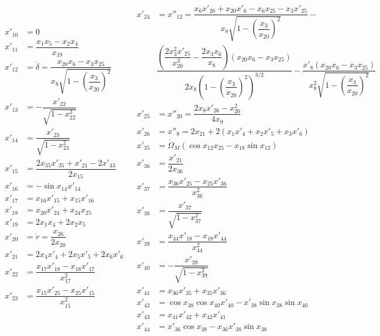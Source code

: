  \begin{align} \label{eq:derTransAnglAux}
\begin{split}
x'_{10} &= 0 \\
x'_{11} &=  \dfrac{x_{1}x_{5}-x_{2}x_{4}}{x_{19}}\\
x'_{12} &= \dot{\delta} = \dfrac{x_{20}x_{6}-x_{3}x_{25}}{x_{8} \sqrt{1-\left(\dfrac{x_{3}}{x_{20}}\right)^{2}}}\\
x'_{13} &= -\dfrac{x'_{22}}{\sqrt{1-x_{22}^{2}}}\\
x'_{14} &= \dfrac{x'_{23}}{\sqrt{1-x_{23}^{2}}}\\
x'_{15} &= \dfrac{2x_{35}x'_{35}+x'_{21}-2x'_{43}}{2x_{15}} \\
x'_{16} &= -\sin x_{14}x'_{14}\\
x'_{17} &= x_{16}x'_{15}+x_{15}x'_{16}\\
x'_{18} &= x_{20}x'_{24}+x_{24}x_{25}\\
x'_{19} &= 2x_{1}x_{4}+2x_{2}x_{5}\\
x'_{20} &= \dot{r} = \dfrac{x_{26}}{2 x_{20}}\\
x'_{21} &= 2x_{4}x'_{4}+2x_{5}x'_{5}+2x_{6}x'_{6}\\
x'_{22} &= \dfrac{x_{17}x'_{18}-x_{18}x'_{17}}{x_{17}^{2}}\\
x'_{23} &= \dfrac{x_{15}x'_{25}-x_{25}x'_{15}}{x_{15}^{2}}\\
\end{split}
&
\begin{split}
x'_{24} &= x''_{12} = \dfrac{x_{6}x'_{20}+x_{20}x'_{6}-x_{6}x_{25}-x_{3}x'_{25}}{x_{8}\sqrt{1-\left(\dfrac{x_{3}}{x_{20}}\right)^{2}}}-\\
&\dfrac{\left(\dfrac{2x_{3}^{2}x'_{25}}{x_{20}^{3}}-\dfrac{2x_{3}x_{6}}{x_{8}}\right)\left(x_{20}x_{6}-x_{3}x_{25}\right)}{2x_{8}\left(1-\left(\dfrac{x_{3}}{x_{20}}\right)^{2}\right)^{3/2}}-\dfrac{x'_{8}\left(x_{20}x_{6}-x_{3}x_{25}\right)}{x_{8}^{2}\sqrt{1-\left(\dfrac{x_{3}}{x_{20}}\right)^{2}}}\\
x'_{25} &= x''_{20} = \dfrac{2x_{8}x'_{26}-x_{26}^{2}}{4x_{9}}\\
x'_{26} &= x''_{8} = 2x_{21}+2\left(x_{1}x'_{4}+x_{2}x'_{5}+x_{3}x'_{6}\right)\\
x'_{35} &=  \dot{\Omega}_{M}\left(\cos x_{12}x_{25}-x_{18}\sin x_{12}\right) \\
x'_{36} &=  \dfrac{x'_{21}}{2x_{36}} \\
x'_{37} &= \dfrac{x_{36}x'_{25}-x_{25}x'_{36}}{x_{36}^{2}} \\
x'_{38} &= \dfrac{x'_{37}}{\sqrt{1-x_{37}^{2}}} \\ 
x'_{39} &= \dfrac{x_{44}x'_{18}-x_{18}x'_{44}}{x_{44}^{2}} \\
x'_{40} &=  -\dfrac{x'_{39}}{\sqrt{1-x_{39}^{2}}}\\
x'_{41} &= x_{36}x'_{35}+x_{35}x'_{36}\\ 
x'_{42} &= \cos x_{38} \cos x_{40} x'_{40}-x'_{38} \sin x_{38} \sin x_{40}\\
x'_{43} &= x_{41}x'_{42}+x_{42}x'_{41} \\ 
x'_{44} & = x'_{36} \cos x_{38}-x_{36} x'_{38}\sin x_{38}\\
\end{split}
\end{align}

